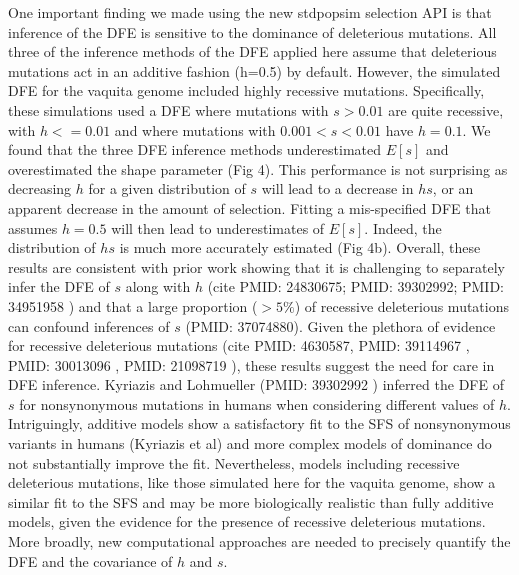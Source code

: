 \documentclass[hidelinks]{article}
\begin{document}
    One important finding we made using the new stdpopsim selection API is that inference of the DFE is sensitive to the dominance of deleterious mutations.
    All three of the inference methods of the DFE applied here assume that deleterious mutations act in an additive fashion (h=0.5) by default.
    However, the simulated DFE for the vaquita genome included highly recessive mutations.
    Specifically, these simulations used a DFE where mutations with $s>0.01$ are quite recessive, with $h<=0.01$ and where mutations with $0.001<s<0.01$ have $h=0.1$.
    We found that the three DFE inference methods underestimated $E[s]$ and overestimated the shape parameter (Fig 4).
    This performance is not surprising as decreasing $h$ for a given distribution of $s$ will lead to a decrease in $hs$,
    or an apparent decrease in the amount of selection.
    Fitting a mis-specified DFE that assumes $h=0.5$ will then lead to underestimates of $E[s]$.
    Indeed, the distribution of $hs$ is much more accurately estimated (Fig 4b).
    Overall, these results are consistent with prior work showing that it is challenging to separately infer the DFE of $s$ along with $h$ (cite PMID: 24830675; PMID: 39302992; PMID: 34951958 )
    and that a large proportion ($>5\%$) of recessive deleterious mutations can confound inferences of $s$ (PMID: 37074880).
    Given the plethora of evidence for recessive deleterious mutations (cite PMID: 4630587, PMID: 39114967 , PMID: 30013096 , PMID: 21098719 ),
    these results suggest the need for care in DFE inference.
    Kyriazis and Lohmueller (PMID: 39302992 ) inferred the DFE of $s$ for nonsynonymous mutations in humans when considering different values of $h$.
    Intriguingly, additive models show a satisfactory fit to the SFS of nonsynonymous variants in humans (Kyriazis et al) and more complex models of dominance do not substantially improve the fit.
    Nevertheless, models including recessive deleterious mutations, like those simulated here for the vaquita genome, show a similar fit to the SFS and may be more biologically realistic than fully additive models,
    given the evidence for the presence of recessive deleterious mutations.
    More broadly, new computational approaches are needed to precisely quantify the DFE and the covariance of $h$ and $s$.
\end{document}
